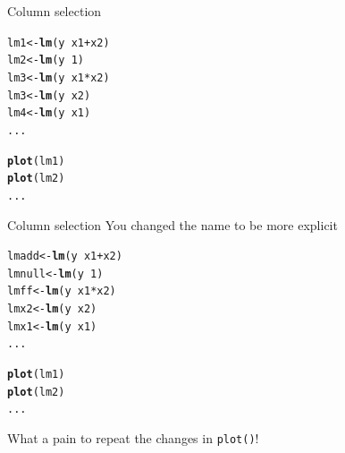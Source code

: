 \documentclass[10pt]{beamer}\usepackage[]{graphicx}\usepackage[]{color}
\makeatletter
\newcommand{\hlnum}[1]{\textcolor[rgb]{0.686,0.059,0.569}{#1}}%
\newcommand{\hlopt}[1]{\textcolor[rgb]{0,0,0}{#1}}%
\newcommand{\hlstd}[1]{\textcolor[rgb]{0.345,0.345,0.345}{#1}}%
\newcommand{\hlkwb}[1]{\textcolor[rgb]{0.69,0.353,0.396}{#1}}%
\newcommand{\hlkwd}[1]{\textcolor[rgb]{0.737,0.353,0.396}{\textbf{#1}}}%
\newenvironment{kframe}{%
 \def\at@end@of@kframe{}%
 \ifinner\ifhmode%
  \def\at@end@of@kframe{\end{minipage}}%
  \begin{minipage}{\columnwidth}%
 \fi\fi%
 \def\FrameCommand##1{\hskip\@totalleftmargin \hskip-\fboxsep
 \colorbox{shadecolor}{##1}\hskip-\fboxsep
     \hskip-\linewidth \hskip-\@totalleftmargin \hskip\columnwidth}%
 \MakeFramed {\advance\hsize-\width
   \@totalleftmargin\z@ \linewidth\hsize
   \@setminipage}}%
 {\par\unskip\endMakeFramed%
 \at@end@of@kframe}
\newenvironment{knitrout}{}{} %
\makeatother
\begin{document}
\begin{frame}[fragile]{Column selection}

\begin{knitrout}
\color{fgcolor}\begin{kframe}
\begin{alltt}
\hlstd{lm1}   \hlkwb{<-} \hlkwd{lm}\hlstd{(y} \hlopt{~} \hlstd{x1} \hlopt{+} \hlstd{x2)}
\hlstd{lm2}   \hlkwb{<-} \hlkwd{lm}\hlstd{(y} \hlopt{~} \hlnum{1}\hlstd{)}
\hlstd{lm3}   \hlkwb{<-} \hlkwd{lm}\hlstd{(y} \hlopt{~} \hlstd{x1}\hlopt{*}\hlstd{x2)}
\hlstd{lm3}   \hlkwb{<-} \hlkwd{lm}\hlstd{(y} \hlopt{~} \hlstd{x2)}
\hlstd{lm4}   \hlkwb{<-} \hlkwd{lm}\hlstd{(y} \hlopt{~} \hlstd{x1)}
\hlstd{...}

\hlkwd{plot}\hlstd{(lm1)}
\hlkwd{plot}\hlstd{(lm2)}
\hlstd{...}
\end{alltt}
\end{kframe}
\end{knitrout}

\end{frame}

\begin{frame}[fragile]{Column selection}
You changed the name to be more explicit

\begin{knitrout}
\color{fgcolor}\begin{kframe}
\begin{alltt}
\hlstd{lmadd}  \hlkwb{<-} \hlkwd{lm}\hlstd{(y} \hlopt{~} \hlstd{x1} \hlopt{+} \hlstd{x2)}
\hlstd{lmnull} \hlkwb{<-} \hlkwd{lm}\hlstd{(y} \hlopt{~} \hlnum{1}\hlstd{)}
\hlstd{lmff}   \hlkwb{<-} \hlkwd{lm}\hlstd{(y} \hlopt{~} \hlstd{x1}\hlopt{*}\hlstd{x2)}
\hlstd{lmx2}   \hlkwb{<-} \hlkwd{lm}\hlstd{(y} \hlopt{~} \hlstd{x2)}
\hlstd{lmx1}   \hlkwb{<-} \hlkwd{lm}\hlstd{(y} \hlopt{~} \hlstd{x1)}
\hlstd{...}

\hlkwd{plot}\hlstd{(lm1)}
\hlkwd{plot}\hlstd{(lm2)}
\hlstd{...}
\end{alltt}
\end{kframe}
\end{knitrout}

What a pain to repeat the changes in \texttt{plot()}!
\pause

\end{frame}
\end{document}

